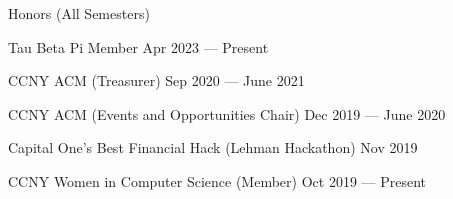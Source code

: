 Honors (All Semesters)

Tau Beta Pi Member \hfill Apr 2023 --- Present
 
CCNY ACM (Treasurer) \hfill Sep 2020 --- June 2021

CCNY ACM (Events and Opportunities Chair) \hfill Dec 2019 --- June 2020

Capital One's Best Financial Hack (Lehman Hackathon) \hfill Nov 2019

CCNY Women in Computer Science (Member) \hfill Oct 2019 --- Present


